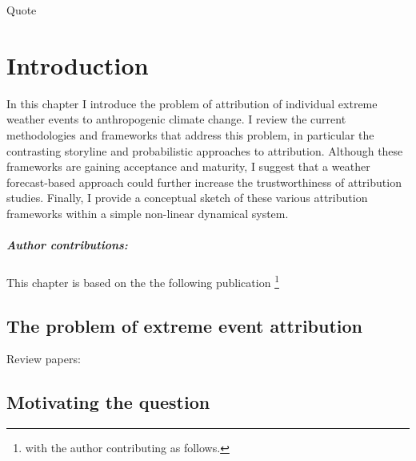 \begin{savequote}[8cm]
    Quote
\end{savequote}
    
\chapter{\label{intro}Introduction} 

In this chapter I introduce the problem of attribution of individual extreme weather events to anthropogenic climate change. I review the current methodologies and frameworks that address this problem, in particular the contrasting storyline and probabilistic approaches to attribution. Although these frameworks are gaining acceptance and maturity, I suggest that a weather forecast-based approach could further increase the trustworthiness of attribution studies. Finally, I provide a conceptual sketch of these various attribution frameworks within a simple non-linear dynamical system.
\small\paragraph{Author contributions:} This chapter is based on the the following publication \footnote{with the author contributing as follows.} \par\vspace{1em}

\clearpage

\minitoc

\clearpage

\section{The problem of extreme event attribution}

  Review papers: \citep{allen_scientific_2007,stott_attribution_2013,stott_attribution_2016,otto_attribution_2016,otto_attribution_2017,swain_attributing_2020,easterling_detection_2016,national_academies_of_sciences_engineering_and_medicine_attribution_2016}

\section{Motivating the question}

